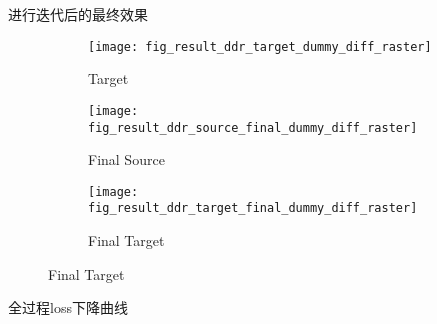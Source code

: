 进行迭代后的最终效果

\begin{figure}[H]
    \centering
        \begin{subfigure}{0.3\linewidth}
            \texttt{[image: fig\_result\_ddr\_target\_dummy\_diff\_raster]}
            \caption{Target}
        \end{subfigure}
        \begin{subfigure}{0.3\linewidth}
            \texttt{[image: fig\_result\_ddr\_source\_final\_dummy\_diff\_raster]}
            \caption{Final Source}
        \end{subfigure}
        \begin{subfigure}{0.3\linewidth}
            \texttt{[image: fig\_result\_ddr\_target\_final\_dummy\_diff\_raster]}
            \caption{Final Target}
        \end{subfigure}
\end{figure}




全过程loss下降曲线

%     
